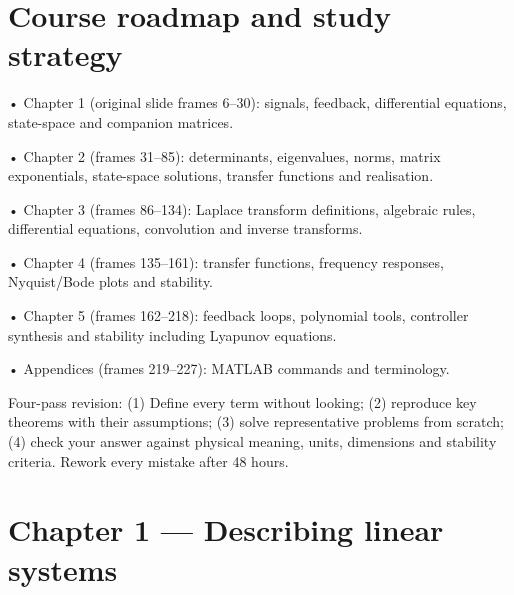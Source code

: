 \documentclass[11pt,a4paper]{article}
\begin{document}
\section{Course roadmap and study strategy}
\begin{studybox}• Chapter 1 (original slide frames 6–30): signals, feedback, differential equations, state-space and companion matrices.\end{studybox}
\begin{studybox}• Chapter 2 (frames 31–85): determinants, eigenvalues, norms, matrix exponentials, state-space solutions, transfer functions and realisation.\end{studybox}
\begin{studybox}• Chapter 3 (frames 86–134): Laplace transform definitions, algebraic rules, differential equations, convolution and inverse transforms.\end{studybox}
\begin{studybox}• Chapter 4 (frames 135–161): transfer functions, frequency responses, Nyquist/Bode plots and stability.\end{studybox}
\begin{studybox}• Chapter 5 (frames 162–218): feedback loops, polynomial tools, controller synthesis and stability including Lyapunov equations.\end{studybox}
\begin{studybox}• Appendices (frames 219–227): MATLAB commands and terminology.\end{studybox}
\begin{conceptbox}Four-pass revision: (1) Define every term without looking; (2) reproduce key theorems with their assumptions; (3) solve representative problems from scratch; (4) check your answer against physical meaning, units, dimensions and stability criteria. Rework every mistake after 48 hours.\end{conceptbox}

\section{Chapter 1 — Describing linear systems}
\end{document}
